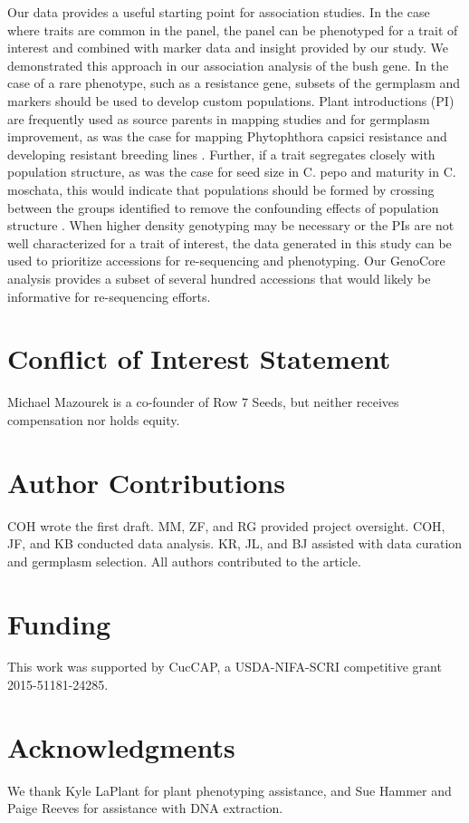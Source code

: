 \documentclass[utf8]{FrontiersinHarvard} %
\begin{document}
Our data provides a useful starting point for association studies. In the case where traits are common in the panel, the panel can be phenotyped for a trait of interest and combined with marker data and insight provided by our study. We demonstrated this approach in our association analysis of the bush gene. In the case of a rare phenotype, such as a resistance gene, subsets of the germplasm and markers should be used to develop custom populations. Plant introductions (PI) are frequently used as source parents in mapping studies and for germplasm improvement, as was the case for mapping Phytophthora capsici resistance and developing resistant breeding lines \citep{}. Further, if a trait segregates closely with population structure, as was the case for seed size in C. pepo and maturity in C. moschata, this would indicate that populations should be formed by crossing between the groups identified to remove the confounding effects of population structure \citep{}. When higher density genotyping may be necessary or the PIs are not well characterized for a trait of interest, the data generated in this study can be used to prioritize accessions for re-sequencing and phenotyping. Our GenoCore analysis provides a subset of several hundred accessions that would likely be informative for re-sequencing efforts.

\section*{Conflict of Interest Statement}
Michael Mazourek is a co-founder of Row 7 Seeds, but neither receives compensation nor holds equity.

\section*{Author Contributions}

COH wrote the first draft. MM, ZF, and RG provided project oversight. COH, JF, and KB conducted data analysis. KR, JL, and BJ assisted with data curation and germplasm selection. All authors contributed to the article.

\section*{Funding}

This work was supported by CucCAP, a USDA-NIFA-SCRI competitive grant 2015-51181-24285.

\section*{Acknowledgments}
We thank Kyle LaPlant for plant phenotyping assistance, and Sue Hammer and Paige Reeves for assistance with DNA extraction.
\end{document}
